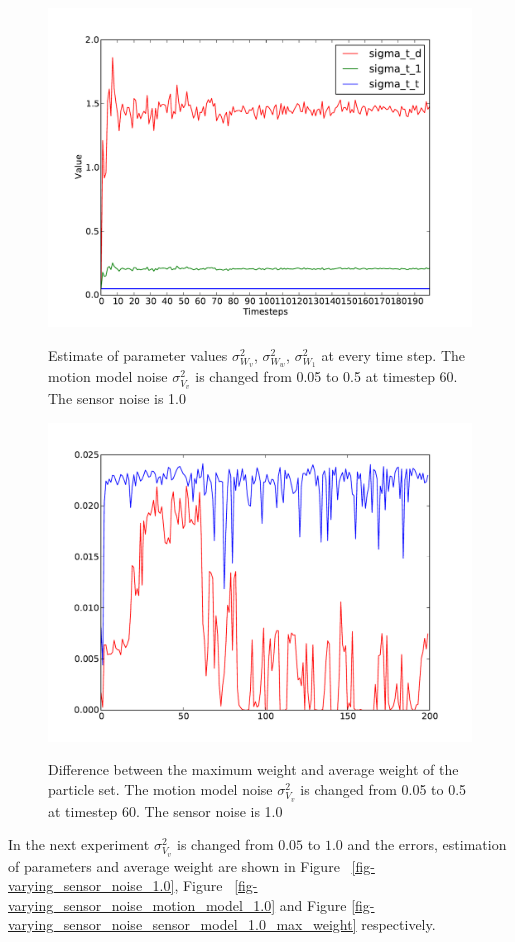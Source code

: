 \documentclass[12pt]{dalcsthesis}
\begin{document}
\begin{figure}
  \centering
     {\includegraphics[height = 3.0 in]{./plots/200_005_05_s_10_motion_model_rotation.pdf}}
  \caption{\label{fig-varying_sensor_noise_motion_model_rotation} Estimate of parameter values $\sigma_{W_{v}}^{2}$, $\sigma_{W_{w}}^{2}$, $\sigma_{W_{1}}^{2}$ at every time step. The motion model noise $\sigma_{V_{v}}^{2}$ is changed from 0.05 to 0.5 at timestep 60. The sensor noise is 1.0}
\end{figure}

\begin{figure}
  \centering
     {\includegraphics[height = 3.0 in]{./plots/200_005_05_s_10_max_weight.pdf}}
  \caption{\label{fig-varying_sensor_noise_sensor_model_max_weight} Difference between the maximum weight and average weight of the particle set. The motion model noise $\sigma_{V_{v}}^{2}$ is changed from 0.05 to 0.5 at timestep 60. The sensor noise is 1.0 }
\end{figure}

In the next experiment $\sigma_{V_{v}}^2$ is changed from $0.05$ to $1.0$ and the errors, estimation of parameters and average weight are shown in Figure ~\ref{fig-varying_sensor_noise_1.0}, Figure ~\ref{fig-varying_sensor_noise_motion_model_1.0} and Figure \ref{fig-varying_sensor_noise_sensor_model_1.0_max_weight} respectively. 
\end{document}
